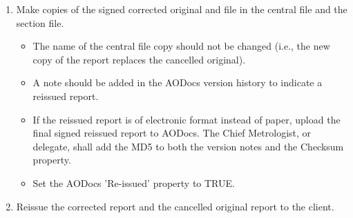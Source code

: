 \begin{enumerate}
\item Make copies of the signed corrected original and file in the central file and the section file. 
\begin{itemize}
\item The name of the central file copy should not be changed (i.e., the new copy of the report replaces the cancelled original). 
\item A note should be added in the AODocs version history to indicate a reissued report.
\item If the reissued report is of electronic format instead of paper, upload the final signed reissued report to AODocs. The Chief Metrologist, or delegate, shall add the MD5 to both the version notes and the Checksum property.
\item Set the AODocs 'Re-issued' property to TRUE.
\end{itemize}
\item Reissue the corrected report and the cancelled original report to the client.
\end{enumerate}

